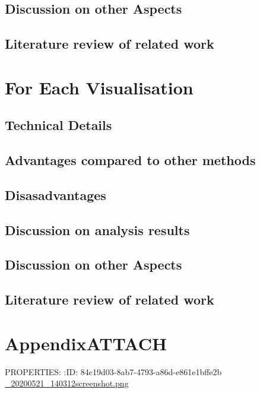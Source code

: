\documentclass[11pt]{article}
\begin{document}
\subsection{Discussion on other Aspects}
\label{sec:orgaf4d269}
\subsection{Literature review of related work}
\label{sec:org6f6c55c}

\section{For Each Visualisation}
\label{sec:orga44b573}

\subsection{Technical Details}
\label{sec:org1cd5e61}
\subsection{Advantages compared to other methods}
\label{sec:org287e7c3}
\subsection{Disasadvantages}
\label{sec:orgaf68546}
\subsection{Discussion on analysis results}
\label{sec:orgb24cd53}
\subsection{Discussion on other Aspects}
\label{sec:org6ddb2bb}
\subsection{Literature review of related work}
\label{sec:org10b9e73}

\section{Appendix\hfill{}\textsc{ATTACH}}
\label{sec:org09fd005}
PROPERTIES:
:ID:       84c19d03-8ab7-4793-a86d-e861e1bffe2b
\url{\_20200521\_140312screenshot.png}
\end{document}
